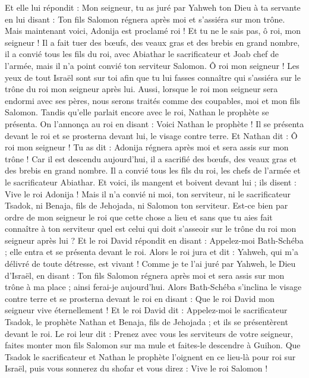 \begin{multicols}{2}
Et elle lui répondit : Mon seigneur, tu as juré par Yahweh ton Dieu à ta servante en lui disant : Ton fils Salomon régnera après moi et s’assiéra sur mon trône.
Mais maintenant voici, Adonija est proclamé roi ! Et tu ne le sais pas, ô roi, mon seigneur !
Il a fait tuer des bœufs, des veaux gras et des brebis en grand nombre, il a convié tous les fils du roi, avec Abiathar le sacrificateur et Joab chef de l'armée, mais il n'a point convié ton serviteur Salomon.
Ô roi mon seigneur ! Les yeux de tout Israël sont sur toi afin que tu lui fasses connaître qui s’assiéra sur le trône du roi mon seigneur après lui.
Aussi, lorsque le roi mon seigneur sera endormi avec ses pères, nous serons traités comme des coupables, moi et mon fils Salomon.
Tandis qu’elle parlait encore avec le roi, Nathan le prophète se présenta.
On l’annonça au roi en disant : Voici Nathan le prophète ! Il se présenta devant le roi et se prosterna devant lui, le visage contre terre.
Et Nathan dit : Ô roi mon seigneur ! Tu as dit : Adonija régnera après moi et sera assis sur mon trône !
Car il est descendu aujourd'hui, il a sacrifié des bœufs, des veaux gras et des brebis en grand nombre. Il a convié tous les fils du roi, les chefs de l'armée et le sacrificateur Abiathar. Et voici, ils mangent et boivent devant lui ; ils disent : Vive le roi Adonija !
Mais il n'a convié ni moi, ton serviteur, ni le sacrificateur Tsadok, ni Benaja, fils de Jehojada, ni Salomon ton serviteur.
Est-ce bien par ordre de mon seigneur le roi que cette chose a lieu et sans que tu aies fait connaître à ton serviteur quel est celui qui doit s'asseoir sur le trône du roi mon seigneur après lui ?
Et le roi David répondit en disant : Appelez-moi Bath-Schéba ; elle entra et se présenta devant le roi.
Alors le roi jura et dit : Yahweh, qui m'a délivré de toute détresse, est vivant !
Comme je te l'ai juré par Yahweh, le Dieu d'Israël, en disant : Ton fils Salomon régnera après moi et sera assis sur mon trône à ma place ; ainsi ferai-je aujourd'hui.
Alors Bath-Schéba s'inclina le visage contre terre et se prosterna devant le roi en disant : Que le roi David mon seigneur vive éternellement !
Et le roi David dit : Appelez-moi le sacrificateur Tsadok, le prophète Nathan et Benaja, fils de Jehojada ; et ils se présentèrent devant le roi.
Le roi leur dit : Prenez avec vous les serviteurs de votre seigneur, faites monter mon fils Salomon sur ma mule et faites-le descendre à Guihon.
Que Tsadok le sacrificateur et Nathan le prophète l'oignent en ce lieu-là pour roi sur Israël, puis vous sonnerez du shofar et vous direz : Vive le roi Salomon !

\end{multicols}
